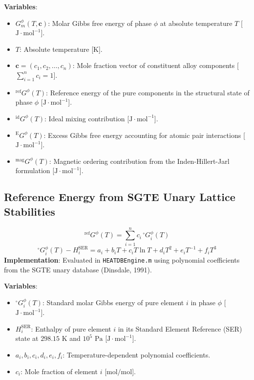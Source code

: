 \documentclass[11pt,a4paper]{article}
\begin{document}
\noindent\textbf{Variables}:
\begin{itemize}
  \item $G_m^\phi(T, \mathbf{c})$: Molar Gibbs free energy of phase $\phi$ at absolute temperature $T$ [$\text{J}\cdot\text{mol}^{-1}$].
  \item $T$: Absolute temperature [$\text{K}$].
  \item $\mathbf{c} = (c_1, c_2, \dots, c_n)$: Mole fraction vector of constituent alloy components [$\sum_{i=1}^n c_i = 1$].
  \item ${^{\text{ref}}}G^\phi(T)$: Reference energy of the pure components in the structural state of phase $\phi$ [$\text{J}\cdot\text{mol}^{-1}$].
  \item ${^{\text{id}}}G^\phi(T)$: Ideal mixing contribution [$\text{J}\cdot\text{mol}^{-1}$].
  \item ${^{\text{E}}}G^\phi(T)$: Excess Gibbs free energy accounting for atomic pair interactions [$\text{J}\cdot\text{mol}^{-1}$].
  \item ${^{\text{mag}}}G^\phi(T)$: Magnetic ordering contribution from the Inden-Hillert-Jarl formulation [$\text{J}\cdot\text{mol}^{-1}$].
\end{itemize}

\subsection{Reference Energy from SGTE Unary Lattice Stabilities}
\begin{equation}
{^{\text{ref}}}G^\phi(T) = \sum_{i=1}^n c_i \, {^\circ}G_i^\phi(T)
\end{equation}
\begin{equation}
{^\circ}G_i^\phi(T) - H_i^{\text{SER}} = a_i + b_i T + c_i T \ln T + d_i T^2 + e_i T^{-1} + f_i T^3
\end{equation}
\textbf{Implementation}: Evaluated in \texttt{HEATDBEngine.m} using polynomial coefficients from the SGTE unary database (Dinsdale, 1991).

\noindent\textbf{Variables}:
\begin{itemize}
  \item ${^\circ}G_i^\phi(T)$: Standard molar Gibbs energy of pure element $i$ in phase $\phi$ [$\text{J}\cdot\text{mol}^{-1}$].
  \item $H_i^{\text{SER}}$: Enthalpy of pure element $i$ in its Standard Element Reference (SER) state at $298.15\text{ K}$ and $10^5\text{ Pa}$ [$\text{J}\cdot\text{mol}^{-1}$].
  \item $a_i, b_i, c_i, d_i, e_i, f_i$: Temperature-dependent polynomial coefficients.
  \item $c_i$: Mole fraction of element $i$ [$\text{mol/mol}$].
\end{itemize}
\end{document}
